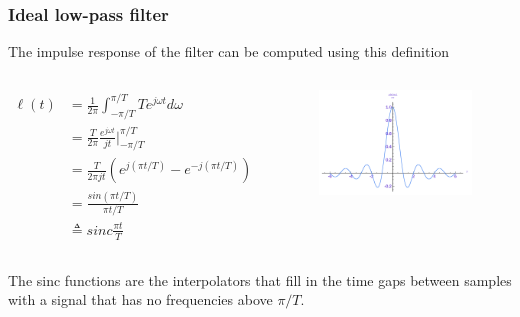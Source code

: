 \begin{frame}
	\frametitle{Ideal low-pass filter}
	The impulse response of the filter can be computed using this definition\\
	\vspace{-2ex}
	\begin{columns}
		\begin{equation}
		\begin{split}
		\ell(t) & = \frac{1}{2\pi} \int_{-\pi/T}^{\pi/T}Te^{j\omega t}d\omega\\
		& = \frac{T}{2\pi} \frac{e^{j\omega t}}{jt} \Big|_{-\pi/T}^{\pi/T}\\
		& = \frac{T}{2\pi jt}(e^{j(\pi t/T)}-e^{-j(\pi t/T)})\\
		& = \frac{sin(\pi t/T)}{\pi t/T}\\
		& \triangleq sinc\frac{\pi t}{T} \nonumber
		\end{split}
		\end{equation}
		\vspace{-2ex}
		\begin{figure}
			\includegraphics[width=1.1\linewidth]{sinc}
		\end{figure}
	\end{columns}
	The sinc functions are the interpolators that fill in the time gaps between samples with a signal that has no frequencies above $\pi/T$.
\end{frame}

